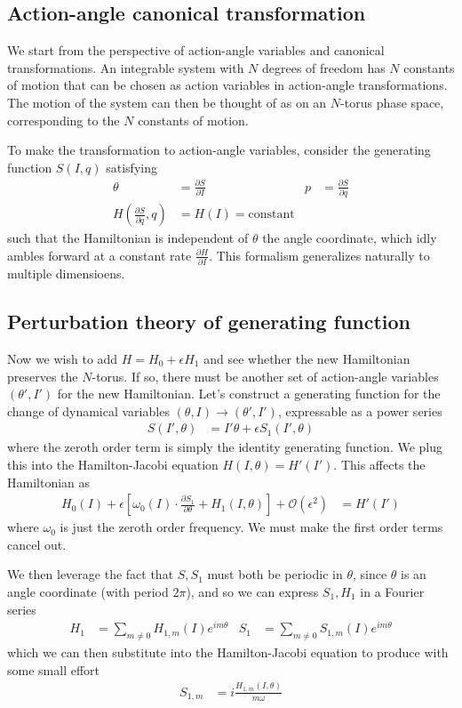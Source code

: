 \documentclass[12pt]{article}
\newcommand{\pd}[2]{\frac{\partial#1}{\partial#2}}
\begin{document}
\subsection{Action-angle canonical transformation}

We start from the perspective of action-angle variables and canonical
transformations. An integrable system with $N$ degrees of freedom has $N$
constants of motion that can be chosen as action variables in action-angle
transformations. The motion of the system can then be thought of as on an
$N$-torus phase space, corresponding to the $N$ constants of motion.

To make the transformation to action-angle variables, consider the generating
function $S(I,q)$ satisfying
\begin{align}
    \theta &= \pd{S}{I} & p &= \pd{S}{q}\\
    H\left( \pd{S}{q}, q \right) &= H(I) = \text{constant}
\end{align}
such that the Hamiltonian is independent of $\theta$ the angle coordinate, which
idly ambles forward at a constant rate $\pd{H}{I}$. This formalism generalizes
naturally to multiple dimensioens.

\subsection{Perturbation theory of generating function}

Now we wish to add $H = H_0 + \epsilon H_1$ and see whether the new Hamiltonian
preserves the $N$-torus. If so, there must be another set of action-angle
variables $(\theta', I')$ for the new Hamiltonian. Let's construct a generating
function for the change of dynamical variables $(\theta, I) \to (\theta', I')$,
expressable as a power series
\begin{align}
    S(I', \theta) &= I'\theta + \epsilon S_1(I', \theta)
\end{align}
where the zeroth order term is simply the identity generating function. We plug
this into the Hamilton-Jacobi equation $H(I,\theta) = H'(I')$. This affects the
Hamiltonian as
\begin{align}
    H_0(I) + \epsilon\left[
        \omega_0(I) \cdot \pd{S_1}{\theta} + H_1(I,\theta)\right]
        + \mathcal{O}(\epsilon^2) &= H'(I')
\end{align}
where $\omega_0$ is just the zeroth order frequency. We must make the first
order terms cancel out.

We then leverage the fact that $S, S_1$ must both be periodic in $\theta$, since
$\theta$ is an angle coordinate (with period $2\pi$), and so we can express
$S_1, H_1$ in a Fourier series
\begin{align}
    H_1 &= \sum\limits_{m \neq 0}^{} H_{1,m}(I)e^{im\theta} &
    S_1 &= \sum\limits_{m \neq 0}^{} S_{1,m}(I)e^{im\theta}
\end{align}
which we can then substitute into the Hamilton-Jacobi equation to produce with
some small effort
\begin{align}
    S_{1,m} &= i\frac{H_{1,m}(I,\theta)}{m\omega}
\end{align}
\end{document}
